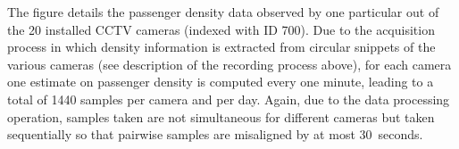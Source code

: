 The figure details the passenger density data observed by one particular out of the 20 installed CCTV cameras (indexed with ID 700).
Due to the acquisition process in which density information is extracted from circular snippets 
of the various cameras (see description of the recording process above), for each camera one estimate on passenger density is computed every one minute, leading to a total of 1440 samples per camera and per day.
Again, due to the data processing operation, samples taken are not simultaneous for different cameras but taken sequentially so that pairwise samples are misaligned by at most 30~seconds.


